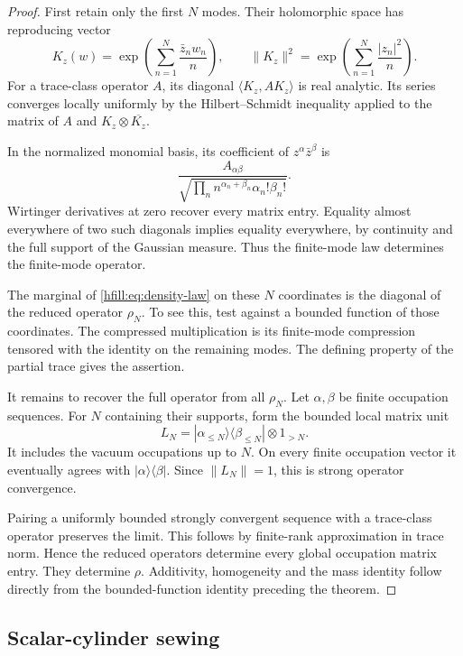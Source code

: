 \begin{proof}
First retain only the first $N$ modes.
Their holomorphic space has reproducing vector
\[
 K_z(w)=\exp\left(\sum_{n=1}^N\frac{\bar z_nw_n}{n}\right),
 \qquad
 \|K_z\|^2=\exp\left(\sum_{n=1}^N\frac{|z_n|^2}{n}\right).
\]
For a trace-class operator $A$, its diagonal
$\langle K_z,AK_z\rangle$ is real analytic.
Its series converges locally uniformly by the Hilbert--Schmidt
inequality applied to the matrix of $A$ and $K_z\otimes\overline{K_z}$.

In the normalized monomial basis, its coefficient of
$z^\alpha\bar z^\beta$ is
\[
 \frac{A_{\alpha\beta}}
 {\sqrt{\prod_n n^{\alpha_n+\beta_n}\alpha_n!\beta_n!}}.
\]
Wirtinger derivatives at zero recover every matrix entry.
Equality almost everywhere of two such diagonals implies equality
everywhere, by continuity and the full support of the Gaussian measure.
Thus the finite-mode law determines the finite-mode operator.

The marginal of \eqref{hfill:eq:density-law} on these $N$ coordinates
is the diagonal of the reduced operator $\rho_N$.
To see this, test against a bounded function of those coordinates.
The compressed multiplication is its finite-mode compression tensored
with the identity on the remaining modes.
The defining property of the partial trace gives the assertion.

It remains to recover the full operator from all $\rho_N$.
Let $\alpha,\beta$ be finite occupation sequences.
For $N$ containing their supports, form the bounded local matrix unit
\[
 L_N=|\alpha_{\leq N}\rangle\langle\beta_{\leq N}|
                         \otimes1_{>N}.
\]
It includes the vacuum occupations up to $N$.
On every finite occupation vector it eventually agrees with
$|\alpha\rangle\langle\beta|$.
Since $\|L_N\|=1$, this is strong operator convergence.

Pairing a uniformly bounded strongly convergent sequence with a
trace-class operator preserves the limit.
This follows by finite-rank approximation in trace norm.
Hence the reduced operators determine every global occupation matrix entry.
They determine $\rho$.
Additivity, homogeneity and the mass identity follow directly from
the bounded-function identity preceding the theorem.
\end{proof}

\subsection{Scalar-cylinder sewing}

